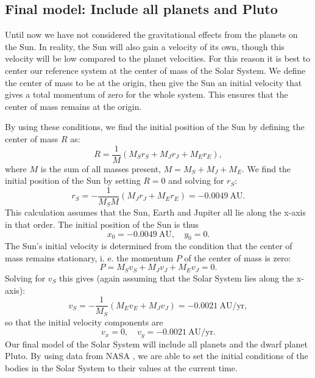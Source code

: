 \documentclass{emulateapj}
\begin{document}
\subsection{Final model: Include all planets and Pluto}

Until now we have not considered the gravitational effects from the planets on the Sun. In reality, the Sun will also gain a velocity of its own, though this velocity will be low compared to the planet velocities. For this reason it is best to center our reference system at the center of mass of the Solar System. We define the center of mass to be at the origin, then give the Sun an initial velocity that gives a total momentum of zero for the whole system. This ensures that the center of mass remains at the origin. 

By using these conditions, we find the initial position of the Sun by defining the center of mass $R$ as:
%
\begin{equation*}
    R = \frac{1}{M}(M_S r_S + M_J r_J + M_E r_E),
\end{equation*}
%
where $M$ is the sum of all masses present, $M = M_S + M_J + M_E$.
We find the initial position of the Sun by setting $R=0$ and solving for $r_S$:
%
\begin{equation*}
    r_S = - \frac{1}{M_S M}\left( M_J r_J + M_E r_E \right) = -0.0049 \ \textrm{AU}.
\end{equation*}
%
This calculation assumes that the Sun, Earth and Jupiter all lie along the x-axis in that order. The initial position of the Sun is thus
%
\begin{equation}
    x_0 = -0.0049 \ \textrm{AU}, \quad y_0 = 0.
\end{equation}
%
The Sun's initial velocity is determined from the condition that the center of mass remains stationary, i. e. the momentum $P$ of the center of mass is zero:
%
\begin{equation*}
    P = M_S v_S + M_J v_J + M_E v_J = 0.
\end{equation*}
%
Solving for $v_S$ this gives (again assuming that the Solar System lies along the x-axis):
%
\begin{equation*}
    v_S = -\frac{1}{M_S}\left( M_E v_E + M_J v_J \right) = -0.0021 \ \textrm{AU/yr},
\end{equation*}
%
so that the initial velocity components are 
%
\begin{equation*}
    v_{x} = 0, \quad v_{y} =  -0.0021 \ \textrm{AU/yr}.
\end{equation*}
%
Our final model of the Solar System will include all planets and the dwarf planet Pluto. By using data from NASA \cite{bib:nasa}, we are able to set the initial conditions of the bodies in the Solar System to their values at the current time.
\end{document}
